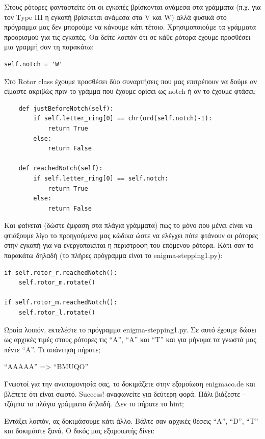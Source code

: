 \documentclass[a4paper,twoside,12pt]{article}
\begin{document}
Στους ρότορες φανταστείτε ότι οι εγκοπές βρίσκονται ανάμεσα στα γράμματα (π.χ. για τον Type III η εγκοπή βρίσκεται ανάμεσα στα V και W) αλλά φυσικά στο πρόγραμμα μας δεν μπορούμε να κάνουμε κάτι τέτοιο. Χρησιμοποιούμε τα γράμματα προορισμού για τις εγκοπές. Θα δείτε λοιπόν ότι σε κάθε ρότορα έχουμε προσθέσει μια γραμμή σαν τη παρακάτω:

\begin{verbatim}
self.notch = 'W'
\end{verbatim}

Στο Rotor class έχουμε προσθέσει δύο συναρτήσεις που μας επιτρέπουν να δούμε αν είμαστε ακριβώς πριν το γράμμα που έχουμε ορίσει ως notch ή αν το έχουμε φτάσει:

\begin{verbatim}
    def justBeforeNotch(self):
        if self.letter_ring[0] == chr(ord(self.notch)-1):
            return True
        else:
            return False

    def reachedNotch(self):
        if self.letter_ring[0] == self.notch:
            return True
        else:
            return False
\end{verbatim}

Και \emph{φαίνεται} (δώστε έμφαση στα πλάγια γράμματα) πως το μόνο που μένει είναι να φτιάξουμε λίγο το προηγούμενο μας κώδικα ώστε να ελέγχει πότε φτάνουν οι ρότορες στην εγκοπή για να ενεργοποιείται η περιστροφή του επόμενου ρότορα. Κάτι σαν το παρακάτω δηλαδή (το πλήρες πρόγραμμα είναι το enigma-stepping1.py):

\begin{verbatim}
if self.rotor_r.reachedNotch():
    self.rotor_m.rotate()

if self.rotor_m.reachedNotch():
    self.rotor_l.rotate()
\end{verbatim}

Ωραία λοιπόν, εκτελέστε το πρόγραμμα enigma-stepping1.py. Σε αυτό έχουμε δώσει ως αρχικές τιμές στους ρότορες τις “A”, “A” και “Τ” και για μήνυμα τα γνωστά μας πέντε “Α”. Τι απάντηση πήρατε;

“AAAAA” => “BMUQO”

Γνωστοί για την ανυπομονησία σας, το δοκιμάζετε στην εξομοίωση enigmaco.de και βλέπετε ότι είναι σωστό. Success! αναφωνείτε για δεύτερη φορά. Πάλι βιάζεστε – τζάμπα τα πλάγια γράμματα δηλαδή. Δεν το πήρατε το hint;

Εντάξει λοιπόν, ας δοκιμάσουμε κάτι άλλο. Βάλτε σαν αρχικές θέσεις “A”, “D”, “T” και δοκιμάστε ξανά. Ο δικός μας εξομοιωτής δίνει:
\end{document}
